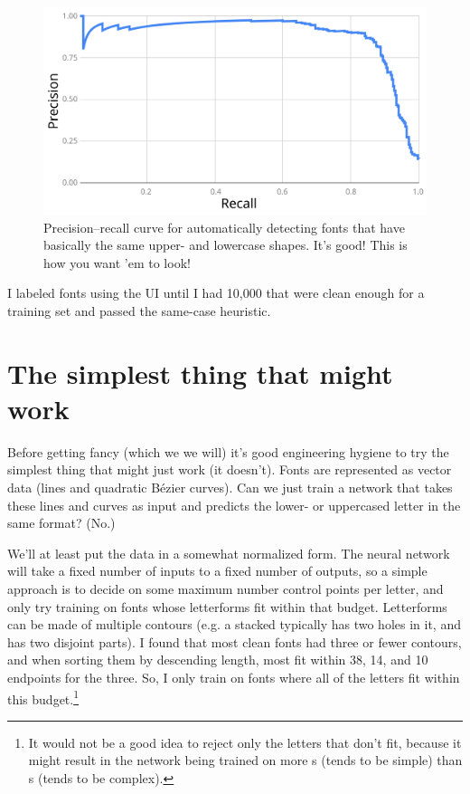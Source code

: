 \documentclass[twocolumn]{amsart}
\begin{document}
\begin{figure}[ht]
\includegraphics[width=0.9 \linewidth]{samecasepr}
\caption{ Precision--recall curve for automatically detecting fonts
  that have basically the same upper- and lowercase shapes. It's good!
  This is how you want 'em to look!
} \label{fig:samecasepr}
\end{figure}

\medskip

I labeled fonts using the UI until I had 10,000 that were clean enough
for a training set and passed the same-case heuristic.

\section{The simplest thing that might work} \label{sec:vectorversion}

Before getting fancy (which we we will) it's good engineering hygiene
to try the simplest thing that might just work (it doesn't). Fonts
are represented as vector data (lines and quadratic B\'ezier curves).
Can we just train a network that takes these lines and curves as input
and predicts the lower- or uppercased letter in the same format? (No.)

We'll at least put the data in a somewhat normalized form. The neural
network will take a fixed number of inputs to a fixed number of
outputs, so a simple approach is to decide on some maximum number
control points per letter, and only try training on fonts whose
letterforms fit within that budget. Letterforms can be made of
multiple contours (e.g. a stacked  typically has two
holes in it, and  has two disjoint parts). I found that
most clean fonts had three or fewer contours, and when sorting them by
descending length, most fit within 38, 14, and 10 endpoints for the
three. So, I only train on fonts where all of the letters fit within
this budget.\footnote{It would not be a good idea to reject only the letters
that don't fit, because it might result in the network being trained
on more s (tends to be simple) than s
(tends to be complex).}
\end{document}
